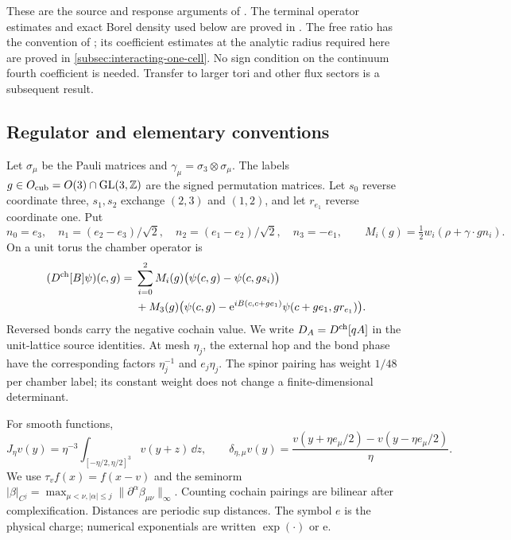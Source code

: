 These are the source and response arguments of
\cite[\S19--20, \S21.1, \S23]{QED3Master}.
The terminal operator estimates and exact Borel density used below are
proved in \cite[Theorem~B, \S6 and Appendix~A]{TerminalPressure}.
The free ratio has the convention of
\cite[Theorem~B]{PositiveProbe}; its coefficient estimates at the
analytic radius required here are proved in \cref{subsec:interacting-one-cell}.
No sign condition on the continuum fourth coefficient is needed.
Transfer to larger tori and other flux sectors is a subsequent result.

\subsection{Regulator and elementary conventions}\label{subsec:rrm-regulator}
Let $\sigma_\mu$ be the Pauli matrices and
$\gamma_\mu=\sigma_3\otimes\sigma_\mu$.
The labels $g\in O_{\rm cub}=O(3)\cap\mathrm{GL}(3,\mathbb Z)$ are
the signed permutation matrices. Let $s_0$ reverse coordinate three,
$s_1,s_2$ exchange $(2,3)$ and $(1,2)$, and let $r_{e_1}$ reverse
coordinate one. Put
\[
 n_0=e_3,\quad n_1=(e_2-e_3)/\sqrt2,\quad
 n_2=(e_1-e_2)/\sqrt2,\quad n_3=-e_1,\qquad
 M_i(g)=\tfrac12w_i(\rho+\gamma\cdot gn_i).
\]
On a unit torus the chamber operator is
\begin{equation}\label{eq:rrm-regulator}
 \begin{split}
 (D^{\rm ch}[B]\psi)(c,g)={}&
 \sum_{i=0}^2M_i(g)\bigl(\psi(c,g)-\psi(c,gs_i)\bigr)\\
 &+M_3(g)\bigl(\psi(c,g)
       -\mathrm e^{iB(c,c+ge_1)}\psi(c+ge_1,gr_{e_1})\bigr).
 \end{split}
\end{equation}
Reversed bonds carry the negative cochain value.
We write $D_A=D^{\rm ch}[qA]$ in the unit-lattice source identities.
At mesh $\eta_j$, the external hop and the bond phase have the
corresponding factors $\eta_j^{-1}$ and $e_j\eta_j$.
The spinor pairing has weight $1/48$ per chamber label; its constant
weight does not change a finite-dimensional determinant.

For smooth functions,
\[
 J_\eta v(y)=\eta^{-3}\int_{[-\eta/2,\eta/2]^3}v(y+z)\,\dd z,
 \qquad
 \delta_{\eta,\mu}v(y)=
 \frac{v(y+\eta e_\mu/2)-v(y-\eta e_\mu/2)}{\eta}.
\]
We use $\tau_vf(x)=f(x-v)$ and the seminorm
$|\beta|_{C^j}=\max_{\mu<\nu,|\alpha|\le j}
\|\partial^\alpha\beta_{\mu\nu}\|_\infty$.
Counting cochain pairings are bilinear after complexification.
Distances are periodic sup distances. The symbol $e$ is the physical
charge; numerical exponentials are written $\exp(\cdot)$ or $\mathrm e$.
